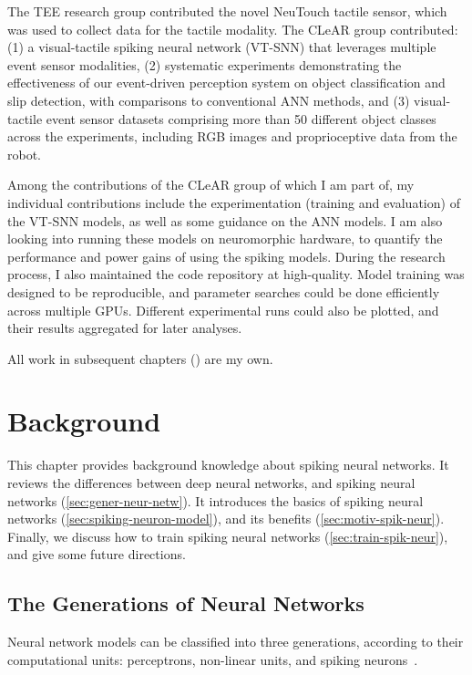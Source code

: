 \documentclass[fyp]{socreport}
\begin{document}
The TEE research group contributed the novel NeuTouch tactile sensor, which was
used to collect data for the tactile modality. The CLeAR group contributed: (1) a
visual-tactile spiking neural network (VT-SNN) that leverages multiple event
sensor modalities, (2) systematic experiments demonstrating the effectiveness of
our event-driven perception system on object classification and slip detection,
with comparisons to conventional ANN methods, and (3) visual-tactile event
sensor datasets comprising more than 50 different object classes across the
experiments, including RGB images and proprioceptive data from the robot.

Among the contributions of the CLeAR group of which I am part of, my individual
contributions include the experimentation (training and evaluation) of the
VT-SNN models, as well as some guidance on the ANN models. I am also looking
into running these models on neuromorphic hardware, to quantify the performance
and power gains of using the spiking models. During the research process, I also
maintained the code repository at high-quality. Model training was designed to
be reproducible, and parameter searches could be done efficiently across
multiple GPUs. Different experimental runs could also be plotted, and their
results aggregated for later analyses.

All work in subsequent chapters () %
are my own.

\chapter{Background\label{chp:background}}

This chapter provides background knowledge about spiking neural networks. It
reviews the differences between deep neural networks, and spiking neural
networks (\ref{sec:gener-neur-netw}). It introduces the basics of spiking neural
networks (\ref{sec:spiking-neuron-model}), and its benefits
(\ref{sec:motiv-spik-neur}). Finally, we discuss how to train spiking neural
networks (\ref{sec:train-spik-neur}), and give some future directions.

\section{The Generations of Neural Networks\label{sec:gener-neur-netw}}

Neural network models can be classified into three generations, according to
their computational units: perceptrons, non-linear units, and spiking
neurons~\cite{MAASS19971659}.
\end{document}
